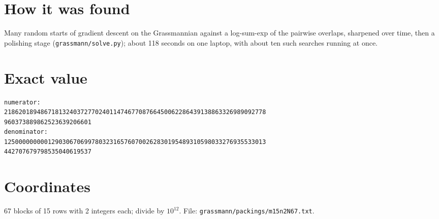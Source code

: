 \documentclass[11pt,a4paper]{article}
\begin{document}
\section{How it was found}
Many random starts of gradient descent on the Grassmannian against a log-sum-exp of the pairwise overlaps, sharpened over time, then a polishing stage (\texttt{grassmann/solve.py}); about 118 seconds on one laptop, with about ten such searches running at once.


\appendix
\section{Exact value}
{\small
\begin{verbatim}
numerator:
218620189486718132403727702401147467708766450062286439138863326989092778
960373889862523639206601
denominator:
125000000000129030670699780323165760700262830195489310598033276935533013
442707679798535040619537
\end{verbatim}}

\section{Coordinates}
67 blocks of 15 rows with 2 integers each; divide by $10^{12}$. File: \texttt{grassmann/packings/m15n2N67.txt}.
{\tiny
\begin{multicols}{4}
\end{multicols}}
\end{document}
